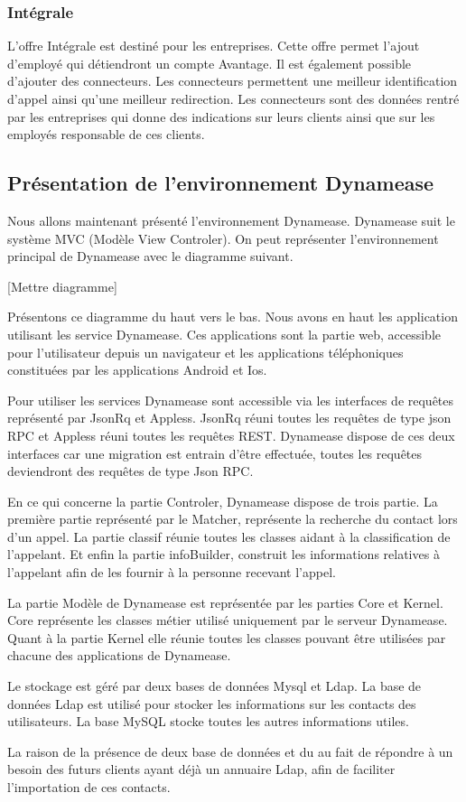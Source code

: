 \subsubsection{Intégrale}

L'offre Intégrale est destiné pour les entreprises. Cette offre permet l'ajout d'employé qui détiendront un compte Avantage. Il est également possible d'ajouter des connecteurs. Les connecteurs permettent une meilleur identification d'appel ainsi qu'une meilleur redirection. Les connecteurs sont des données rentré par les entreprises qui donne des indications sur leurs clients ainsi que sur les employés responsable de ces clients.

\subsection{Présentation de l'environnement Dynamease}

Nous allons maintenant présenté l'environnement Dynamease. Dynamease suit le système MVC (Modèle View Controler). On peut représenter l'environnement principal de Dynamease avec le diagramme suivant.

[Mettre diagramme]

Présentons ce diagramme du haut vers le bas. Nous avons en haut les application utilisant les service Dynamease. Ces applications sont la partie web, accessible pour l'utilisateur depuis un navigateur et les applications téléphoniques constituées par les applications Android et Ios.

Pour utiliser les services Dynamease sont accessible via les interfaces de requêtes représenté par JsonRq et Appless. JsonRq réuni toutes les requêtes de type json RPC et Appless réuni toutes les requêtes REST. Dynamease dispose de ces deux interfaces car une migration est entrain d'être effectuée, toutes les requêtes deviendront des requêtes de type Json RPC.

En ce qui concerne la partie Controler, Dynamease dispose de trois partie. La première partie représenté par le Matcher, représente la recherche du contact lors d'un appel. La partie classif réunie toutes les classes aidant à la classification de l'appelant. Et enfin la partie infoBuilder, construit les informations relatives à l'appelant afin de les fournir à la personne recevant l'appel.

La partie Modèle de Dynamease est représentée par les parties Core et Kernel. Core représente les classes métier utilisé uniquement par le serveur Dynamease. Quant à la partie Kernel elle réunie toutes les classes pouvant être utilisées par chacune des applications de Dynamease.

Le stockage est géré par deux bases de données Mysql et Ldap. La base de données Ldap est utilisé pour stocker les informations sur les contacts des utilisateurs. La base MySQL stocke toutes les autres informations utiles.

La raison de la présence de deux base de données et du au fait de répondre à un besoin des futurs clients ayant déjà un annuaire Ldap, afin de faciliter l'importation de ces contacts.

